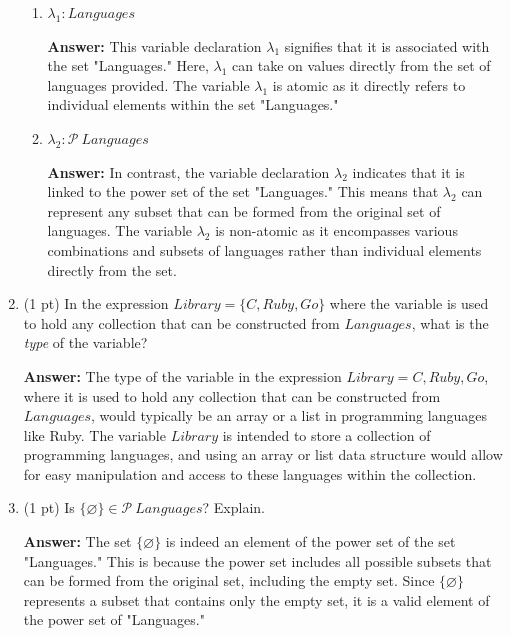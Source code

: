 \documentclass[12pt]{article}
\begin{document}
\begin{spacing}{1.5}
\begin{enumerate}
		      \begin{enumerate}
		      	\item $\lambda_1 : Languages$
		      	      		      	      
		      	      \textbf{Answer:} This variable declaration $\lambda_1$ signifies that it is associated with the set "Languages." Here, $\lambda_1$ can take on values directly from the set of languages provided. The variable $\lambda_1$ is atomic as it directly refers to individual elements within the set "Languages."\\
		      	      		      	                  
		      	\item $\lambda_2 : \mathcal{P} \: Languages$
		      	      		      	          
		      	      \textbf{Answer:} In contrast, the variable declaration $\lambda_2$ indicates that it is linked to the power set of the set "Languages." This means that $\lambda_2$ can represent any subset that can be formed from the original set of languages. The variable $\lambda_2$ is non-atomic as it encompasses various combinations and subsets of languages rather than individual elements directly from the set.\\
		      	      		      	                  
		      \end{enumerate}
		      		      
		\item (1 pt) In the expression $Library = \{C, Ruby, Go\}$ where the variable is used to hold any collection that can be constructed from $Languages$, what is the \textit{type} of the variable?
		      		      
		      \textbf{Answer:} The type of the variable in the expression $Library = {C, Ruby, Go}$, where it is used to hold any collection that can be constructed from $Languages$, would typically be an array or a list in programming languages like Ruby. The variable $Library$ is intended to store a collection of programming languages, and using an array or list data structure would allow for easy manipulation and access to these languages within the collection.\\
		      		                  
		\item (1 pt) Is $\{\varnothing\} \in \mathcal{P} \: Languages$? Explain.
		      		      
		      \textbf{Answer:} The set $\{\varnothing\}$ is indeed an element of the power set of the set "Languages." This is because the power set includes all possible subsets that can be formed from the original set, including the empty set. Since $\{\varnothing\}$ represents a subset that contains only the empty set, it is a valid element of the power set of "Languages."\\
		      		                  

\end{enumerate}
\end{spacing}
\end{document}
